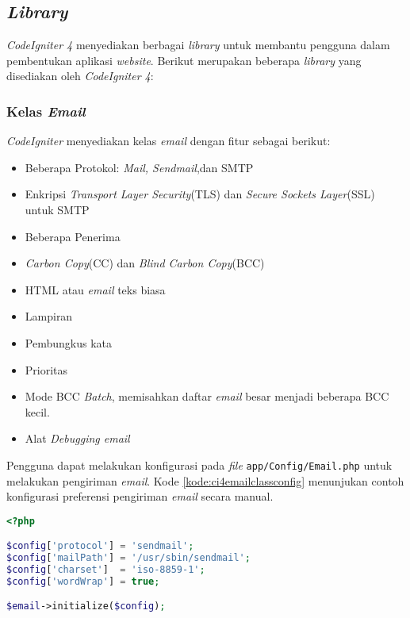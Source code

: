 \subsection{\textit{Library}}
\textit{CodeIgniter 4} menyediakan berbagai \textit{library} untuk membantu pengguna dalam pembentukan aplikasi \textit{website}. Berikut merupakan beberapa \textit{library} yang disediakan oleh \textit{CodeIgniter 4}:
\subsubsection{Kelas \textit{Email}}
\textit{CodeIgniter} menyediakan kelas \textit{email} dengan fitur sebagai berikut:
\begin{itemize}
\item Beberapa Protokol: \textit{Mail, Sendmail},dan SMTP
\item Enkripsi \textit{Transport Layer Security}(TLS) dan \textit{Secure Sockets Layer}(SSL) untuk SMTP
\item Beberapa Penerima
\item \textit{Carbon Copy}(CC) dan \textit{Blind Carbon Copy}(BCC)
\item HTML atau \textit{email} teks biasa
\item Lampiran
\item Pembungkus kata
\item Prioritas
\item Mode BCC \textit{Batch}, memisahkan daftar \textit{email} besar menjadi beberapa BCC kecil.
\item Alat \textit{Debugging email}
\end{itemize}

Pengguna dapat melakukan konfigurasi pada \textit{file} \verb|app/Config/Email.php| untuk melakukan pengiriman \textit{email}. Kode \ref{kode:ci4emailclassconfig} menunjukan contoh konfigurasi preferensi pengiriman \textit{email} secara manual.
 \begin{lstlisting}[language=PHP, caption=Contoh kode untuk melakukan konfigurasi \textit{email}. ,label=kode:ci4emailclassconfig]
<?php

$config['protocol'] = 'sendmail';
$config['mailPath'] = '/usr/sbin/sendmail';
$config['charset']  = 'iso-8859-1';
$config['wordWrap'] = true;

$email->initialize($config);
\end{lstlisting}

